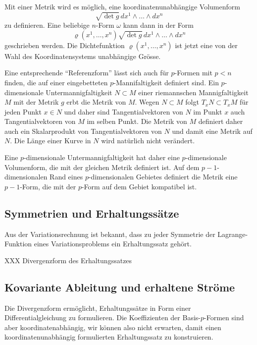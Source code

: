 Mit einer Metrik wird es möglich, eine koordinatenunabhängige Volumenform
\[
\sqrt{\det g}
\,dx^1\wedge\dots\wedge dx^n
\]
zu definieren.
Eine beliebige $n$-Form $\omega$ kann dann in der Form
\[
\varrho(x^1,\dots,x^n)
\sqrt{\det g}
\,dx^1\wedge \dots \wedge dx^n
\]
geschrieben werden.
Die Dichtefunktion $\varrho(x^1,\dots,x^n)$ ist jetzt eine von der
Wahl des Koordinatensystems unabhängige Grösse.

Eine entsprechende ``Referenzform'' lässt sich auch für $p$-Formen mit
$p<n$ finden, die auf einer eingebetteten $p$-Mannifaltigkeit
definiert sind.
Ein $p$-dimensionale Untermannigfaltigkeit $N\subset M$ einer
riemannschen Mannigfaltigkeit $M$ mit der Metrik $g$ erbt die Metrik
von $M$.
Wegen $N\subset M$ folgt $T_xN\subset T_xM$ für jeden Punkt $x\in N$
und daher sind Tangentialvektoren von $N$ im Punkt $x$ auch
Tangentialvektoren von $M$ im selben Punkt.
Die Metrik von $M$ definiert daher auch ein Skalarprodukt von
Tangentialvektoren von $N$ und damit eine Metrik auf $N$.
Die Länge einer Kurve in $N$ wird natürlich nicht verändert.

Eine $p$-dimensionale Untermannigfaltigkeit hat daher eine $p$-dimensionale
Volumenform, die mit der gleichen Metrik definiert ist.
Auf dem $p-1$-dimensionalen Rand eines $p$-dimensionalen Gebietes definiert
die Metrik eine $p-1$-Form, die mit der $p$-Form auf dem Gebiet kompatibel
ist.

%
%
\subsection{Symmetrien und Erhaltungssätze
\label{buch:zusammenhang:divergenz:subsection:noether}}
Aus der Variationsrechnung \cite[Abschnitt 10.2]{buch:seminarvariation}
ist bekannt, dass zu jeder Symmetrie der Lagrange-Funktion eines
Variationsproblems ein Erhaltungssatz gehört.

XXX Divergenzform des Erhaltungssatzes

%
%
\subsection{Kovariante Ableitung und erhaltene Ströme
\label{buch:zusammenhang:divergenz:subsetion:kovariant}}
Die Divergenzform ermöglicht, Erhaltungssätze in Form einer 
Differentialgleichung zu formulieren.
Die Koeffizienten der Basis-$p$-Formen sind aber koordinatenabhängig,
wir können also nicht erwarten, damit einen koordinatenunabhängig
formulierten Erhaltungssatz zu konstruieren.

